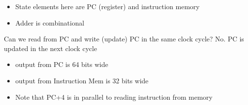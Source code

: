 \begin{frame}[fragile]
{\small \begin{itemize}
\item State elements here are PC (register) and instruction memory
\item Adder is combinational
\end{itemize}}
\begin{tcolorbox}[enhanced,attach boxed title to top center={yshift=-3mm,yshifttext=-1mm},
  colback=blue!5!white,colframe=blue!75!black,colbacktitle=blue!80!black,
  title=Think About It,fonttitle=\bfseries,
  boxed title style={size=small,colframe=red!50!black} ]
  Can we read from PC and write (update) PC in the same clock cycle? {\small{\color{red}No. PC is updated in the next clock cycle}}
  \end{tcolorbox}

\BNotes\ifnum{}
\begin{itemize}
\item output from PC is 64 bits wide
\item output from Instruction Mem is 32 bits wide
\item Note that PC+4 is in parallel to reading instruction from memory
\end{itemize}
\fi\ENotes
\end{frame}

